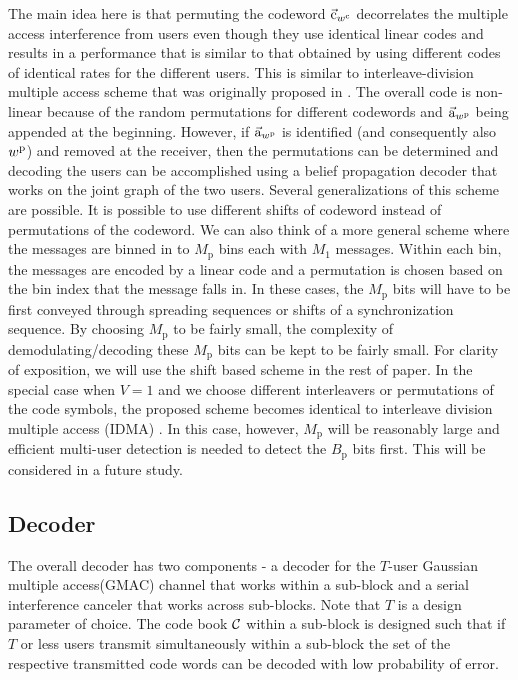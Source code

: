 The main idea here is that permuting the codeword $\vec{\mathrm{c}}_{w^\mathrm{c}}$ decorrelates the multiple access interference from users even though they use identical linear codes and results in a performance that is similar to that obtained by using different codes of identical rates for the different users. This is similar to interleave-division multiple access scheme that was originally proposed in \cite{ping2006interleave}. The overall code is non-linear because of the random permutations for different codewords and $\vec{\mathrm{a}}_{w^\mathrm{p}}$ being appended at the beginning. However, if $\vec{\mathrm{a}}_{w^\mathrm{p}}$ is identified (and consequently also $w^\mathrm{p}$) and removed at the receiver, then the permutations can be determined and decoding the users  can be accomplished using a belief propagation decoder that works on the joint graph of the two users.
\iflonger
Several generalizations of this scheme are possible. It is possible to use different shifts of codeword instead of permutations of the codeword. We can also think of a more general scheme where the messages are binned in to $M_\mathrm{p}$ bins each with $M_1$ messages. Within each bin, the messages are encoded by a linear code and a permutation is chosen based on the bin index that the message falls in. In these cases, the $M_\mathrm{p}$ bits will have to be first conveyed through spreading sequences or shifts of a synchronization sequence. By choosing $M_\mathrm{p}$ to be fairly small, the complexity of demodulating/decoding these $M_\mathrm{p}$ bits can be kept to be fairly small. For clarity of exposition, we will use the shift based scheme in the rest of paper. In the special case when $V=1$ and we choose different interleavers or permutations of the code symbols, the proposed scheme becomes identical to interleave division multiple access (IDMA) \cite{ping2006interleave}. In this case, however, $M_\mathrm{p}$ will be reasonably large and efficient multi-user detection is needed to detect the $B_\mathrm{p}$ bits first. This will be considered in a future study.
\fi

\subsection{Decoder}
The overall decoder has two components - a decoder for the $T$-user Gaussian multiple access(GMAC) channel that works within a sub-block and a serial interference canceler that works across sub-blocks. Note that $T$ is a design parameter of choice. The code book $\mathcal{C}$ within a sub-block is designed such that if $T$ or less users transmit simultaneously within a sub-block the set of the respective transmitted code words can be decoded with low probability of error. 

